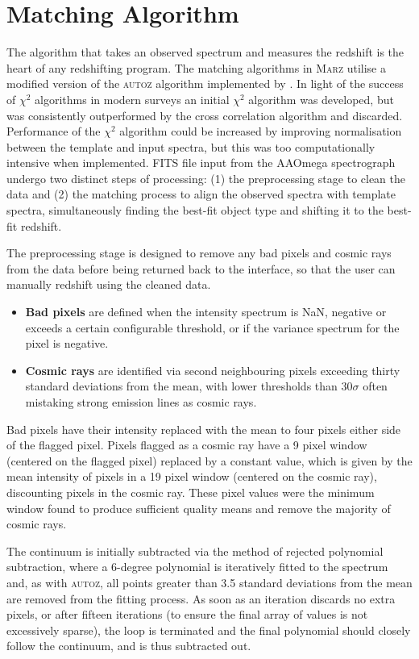 \documentclass[5p]{elsarticle}
\newcommand{\autoz}{\textsc{autoz}}
\newcommand{\marz}{\textsc{Marz}}
\begin{document}
\section{Matching Algorithm} \label{sec:algorithm}

The algorithm that takes an observed spectrum and measures the redshift is the heart of any redshifting program. The matching algorithms in \marz{} utilise a modified version of the \autoz{} algorithm implemented by \citet{baldry2014galaxy}. In light of the success of $\chi^2$ algorithms in modern surveys \citep{bolton2012} an initial $\chi^2$ algorithm was developed, but was consistently outperformed by the cross correlation algorithm and discarded. Performance of the $\chi^2$ algorithm could be increased by improving normalisation between the template and input spectra, but this was too computationally intensive when implemented. FITS file input from the AAOmega spectrograph undergo two distinct steps of processing: (1) the preprocessing stage to clean the data and (2) the matching process to align the observed spectra with template spectra, simultaneously finding the best-fit object type and shifting it to the best-fit redshift.

The preprocessing stage is designed to remove any bad pixels and cosmic rays from the data before being returned back to the interface, so that the user can manually redshift using the cleaned data.
\begin{itemize}
\item \textbf{Bad pixels} are defined when the intensity spectrum is NaN, negative or exceeds a certain configurable threshold, or if the variance spectrum for the pixel is negative.
\item \textbf{Cosmic rays} are identified via second neighbouring pixels exceeding thirty standard deviations from the mean, with lower thresholds than $30\sigma$ often mistaking strong emission lines as cosmic rays. 
\end{itemize}
Bad pixels have their intensity replaced with the mean to four pixels either side of the flagged pixel. Pixels flagged as a cosmic ray have a 9 pixel window (centered on the flagged pixel) replaced by a constant value, which is given by the mean intensity of pixels in a 19 pixel window (centered on the cosmic ray), discounting pixels in the cosmic ray. These pixel values were the minimum window found to produce sufficient quality means and remove the majority of cosmic rays.

The continuum is initially subtracted via the method of rejected polynomial subtraction, where a 6-degree polynomial is iteratively fitted to the spectrum and, as with \autoz{}, all points greater than 3.5 standard deviations from the mean are removed from the fitting process. As soon as an iteration discards no extra pixels, or after fifteen iterations (to ensure the final array of values is not excessively sparse), the loop is terminated and the final polynomial should closely follow the continuum, and is thus subtracted out.
\end{document}
